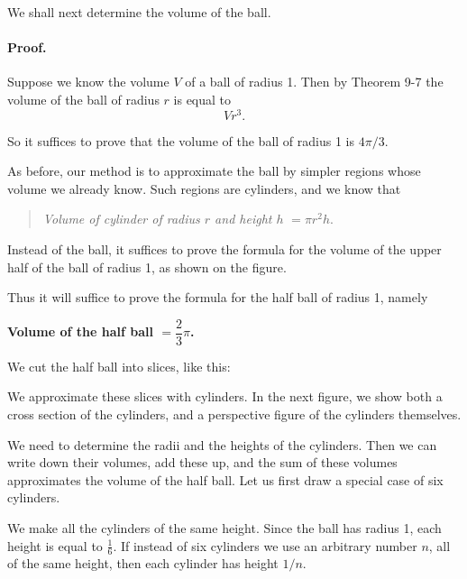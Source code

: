 \documentclass[12pt]{book} %
\begin{document}
We shall next determine the volume of the ball.


\paragraph{Proof.}
Suppose we know the volume $V$ of a ball of radius 1. Then by Theorem 9-7 the volume of the ball of radius $r$ is equal to
\[
Vr^3.
\]

So it suffices to prove that the volume of the ball of radius 1 is $4\pi/3$.

As before, our method is to approximate the ball by simpler regions whose volume we already know. Such regions are cylinders, and we know that

\begin{quote}
\textit{Volume of cylinder of radius $r$ and height $h$} $=\pi r^2h$.
\end{quote}

Instead of the ball, it suffices to prove the formula for the volume of the upper half of the ball of radius 1, as shown on the figure.


Thus it will suffice to prove the formula for the half ball of radius 1, namely

\begin{center}
\textbf{Volume of the half ball $=\dfrac{2}{3}\pi$.}
\end{center}

We cut the half ball into slices, like this:


We approximate these slices with cylinders. In the next figure, we show both a cross section of the cylinders, and a perspective figure of the cylinders themselves.


We need to determine the radii and the heights of the cylinders. Then we can write down their volumes, add these up, and the sum of these volumes approximates the volume of the half ball. Let us first draw a special case of six cylinders.


We make all the cylinders of the same height. Since the ball has radius 1, each height is equal to $\frac16$. If instead of six cylinders we use an arbitrary number $n$, all of the same height, then each cylinder has height $1/n$.
\end{document}
